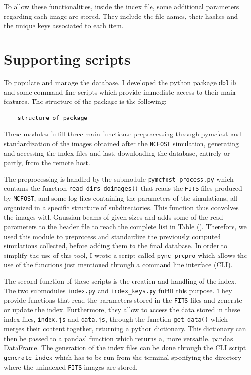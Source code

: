\documentclass[a4paper,10pt]{report}
\begin{document}
To allow these functionalities, inside the index file, some additional parameters regarding each image are stored.
They include the file names, their hashes and the unique keys associated to each item.

\section{Supporting scripts}

To populate and manage the database, I developed the python package \lstinline{dblib}
and some command line scripts which provide immediate access to their main features.
The structure of the package is the following:
\begin{lstlisting}
    structure of package
\end{lstlisting}

These modules fulfill three main functions: preprocessing through pymcfost and standardization
of the images obtained after the \lstinline{MCFOST} simulation, generating and accessing
the index files and last, downloading the database, entirely or partly, from the remote host.

The preprocessing is handled by the submodule \lstinline{pymcfost_process.py} which contains the function 
\lstinline{read_dirs_doimages()} that reads the \lstinline{FITS} files produced by \lstinline{MCFOST},
and some log files containing the parameters of the simulations, all  organized in a specific structure of subdirectories.
This function thus convolves the images with Gaussian beams of given sizes and adds some of the read parameters to the header
file to reach the complete list in Table ().
Therefore, we used this module to preprocess and standardize the previously computed
simulations collected, before adding them to the final database.
In order to simplify the use of this tool, I wrote a script called \lstinline{pymc_prepro} which
allows the use of the functions just mentioned through a command line interface (CLI).

The second function of these scripts is the creation and handling of the index.
The two submodules \lstinline{index.py} and \lstinline{index_keys.py} fulfill this purpose. They provide functions
that read the parameters stored in the \lstinline{FITS} files and generate or update the
index. Furthermore, they allow to access the data stored in these index files, \lstinline{index.js} and \lstinline{data.js}, 
through the function \lstinline{get_data()}
which merges their content together, returning a python dictionary.
This dictionary can then be passed to a pandas' function which returns a, more versatile, pandas DataFrame.
The generation of the index files can be done through the CLI script \lstinline{generate_index} which has to be run from 
the terminal specifying the directory where the unindexed \lstinline{FITS} images are stored.
\end{document}
